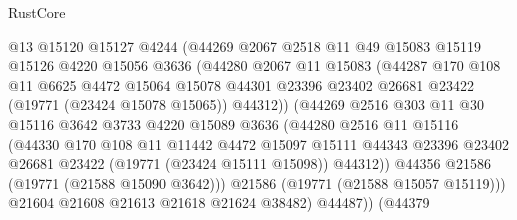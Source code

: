\begin{lexlean}{RustCore}
\begin{coremodule}
                      @13
                      @15120
                      @15127
                      @4244
                      (@44269
                        @2067
                        @2518
                        @11
                        @49
                        @15083
                        @15119
                        @15126
                        @4220
                        @15056
                        @3636
                        (@44280
                          @2067
                          @11
                          @15083
                          (@44287
                            @170
                            @108
                            @11
                            @6625
                            @4472
                            @15064
                            @15078
                            @44301
                            @23396
                            @23402
                            @26681
                            @23422
                            (@19771 (@23424 @15078 @15065))
                            @44312))
                        (@44269
                          @2516
                          @303
                          @11
                          @30
                          @15116
                          @3642
                          @3733
                          @4220
                          @15089
                          @3636
                          (@44280
                            @2516
                            @11
                            @15116
                            (@44330
                              @170
                              @108
                              @11
                              @11442
                              @4472
                              @15097
                              @15111
                              @44343
                              @23396
                              @23402
                              @26681
                              @23422
                              (@19771 (@23424 @15111 @15098))
                              @44312))
                          @44356
                          @21586
                          (@19771 (@21588 @15090 @3642)))
                        @21586
                        (@19771 (@21588 @15057 @15119)))
                      @21604
                      @21608
                      @21613
                      @21618
                      @21624
                      @38482)
                    @44487))
                (@44379

\end{coremodule}
\end{lexlean}
